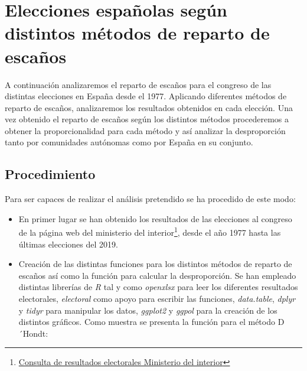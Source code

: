 \documentclass[12pt,a4paper,]{book}
\providecommand{\tightlist}{%
  \setlength{\itemsep}{0pt}\setlength{\parskip}{0pt}}
\let\rmarkdownfootnote\footnote%
\def\footnote{\protect\rmarkdownfootnote}
\numberwithin{dummy}{section}
\theoremstyle{ocrenumbox}
\theoremstyle{blacknumex}
\theoremstyle{blacknumbox}
\theoremstyle{ocrenum}
\theoremstyle{ocrenum}
\begin{document}
\hypertarget{elecciones-espauxf1olas-seguxfan-distintos-muxe9todos-de-reparto-de-escauxf1os}{%
\chapter{Elecciones españolas según distintos métodos de reparto de
escaños}\label{elecciones-espauxf1olas-seguxfan-distintos-muxe9todos-de-reparto-de-escauxf1os}}

A continuación analizaremos el reparto de escaños para el congreso de
las distintas elecciones en España desde el 1977. Aplicando diferentes
métodos de reparto de escaños, analizaremos los resultados obtenidos en
cada elección. Una vez obtenido el reparto de escaños según los
distintos métodos procederemos a obtener la proporcionalidad para cada
método y así analizar la desproporción tanto por comunidades autónomas
como por España en su conjunto.

\hypertarget{procedimiento-1}{%
\section{Procedimiento}\label{procedimiento-1}}

Para ser capaces de realizar el análisis pretendido se ha procedido de
este modo:

\begin{itemize}
\tightlist
\item
  En primer lugar se han obtenido los resultados de las elecciones al
  congreso de la página web del ministerio del interior\footnote{\href{http://www.infoelectoral.mir.es/min/}{Consulta
    de resultados electorales Ministerio del interior}}, desde el año
  1977 hasta las últimas elecciones del 2019.
\end{itemize}

\begin{itemize}
\tightlist
\item
  Creación de las distintas funciones para los distintos métodos de
  reparto de escaños así como la función para calcular la desproporción.
  Se han empleado distintas librerías de \emph{R} tal y como
  \emph{openxlsx} para leer los diferentes resultados electorales,
  \emph{electoral} como apoyo para escribir las funciones,
  \emph{data.table}, \emph{dplyr} y \emph{tidyr} para manipular los
  datos, \emph{ggplot2} y \emph{ggpol} para la creación de los distintos
  gráficos. Como muestra se presenta la función para el método D´Hondt:
\end{itemize}
\end{document}
